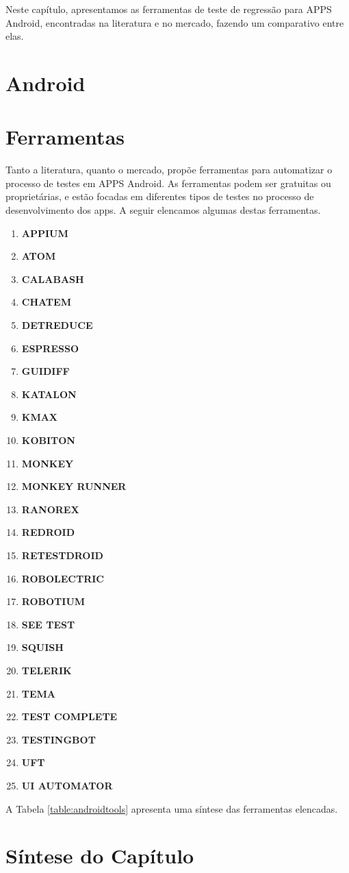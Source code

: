 
Neste capítulo, apresentamos as ferramentas de teste de regressão para \ac{APPS} Android, encontradas na literatura e no mercado, fazendo um comparativo entre elas.

\section{Android}

\section{Ferramentas}

Tanto a literatura, quanto o mercado, propõe ferramentas para automatizar o processo de testes em \ac{APPS} Android. As ferramentas podem ser gratuitas ou proprietárias, e estão focadas em diferentes tipos de testes no processo de desenvolvimento dos apps. A seguir elencamos algumas destas ferramentas.

\begin{enumerate}
    \item \textbf{APPIUM}
    


    \item \textbf{ATOM}
    \item \textbf{CALABASH}
    \item \textbf{CHATEM}
    \item \textbf{DETREDUCE}
    \item \textbf{ESPRESSO}
    \item \textbf{GUIDIFF}
    \item \textbf{KATALON}
    \item \textbf{KMAX}
    \item \textbf{KOBITON}
    \item \textbf{MONKEY}
    \item \textbf{MONKEY RUNNER}
    \item \textbf{RANOREX}
    \item \textbf{REDROID}
    \item \textbf{RETESTDROID}
    \item \textbf{ROBOLECTRIC}
    \item \textbf{ROBOTIUM}
    \item \textbf{SEE TEST}
    \item \textbf{SQUISH}
    \item \textbf{TELERIK}
    \item \textbf{TEMA}
    \item \textbf{TEST COMPLETE}
    \item \textbf{TESTINGBOT}
    \item \textbf{UFT}
    \item \textbf{UI AUTOMATOR}
    
\end{enumerate}

A Tabela \ref{table:androidtools} apresenta uma síntese das ferramentas elencadas.





\section{Síntese do Capítulo}